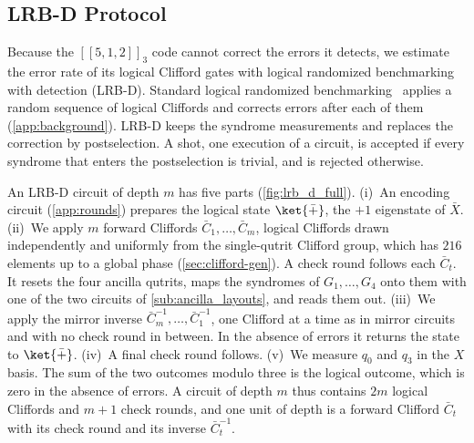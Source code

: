 \subsection{LRB-D Protocol}
\label{sub:lrb_d}\label{subsub:postselection}

Because the $[[5,1,2]]_3$ code cannot correct the errors it detects, we estimate the error rate of its logical Clifford gates with logical randomized benchmarking with detection (LRB-D). Standard logical randomized benchmarking~\cite{Combes2017} applies a random sequence of logical Cliffords and corrects errors after each of them (\autoref{app:background}). LRB-D keeps the syndrome measurements and replaces the correction by postselection. A shot, one execution of a circuit, is accepted if every syndrome that enters the postselection is trivial, and is rejected otherwise.

An LRB-D circuit of depth $m$ has five parts (\autoref{fig:lrb_d_full}). (i)~An encoding circuit (\autoref{app:rounds}) prepares the logical state $\ket{\bar{+}}$, the $+1$ eigenstate of $\bar X$. (ii)~We apply $m$ forward Cliffords $\bar C_1, \dots, \bar C_m$, logical Cliffords drawn independently and uniformly from the single-qutrit Clifford group, which has $216$ elements up to a global phase (\autoref{sec:clifford-gen}). A check round follows each $\bar C_t$. It resets the four ancilla qutrits, maps the syndromes of $G_1, \dots, G_4$ onto them with one of the two circuits of \autoref{sub:ancilla_layouts}, and reads them out. (iii)~We apply the mirror inverse $\bar C_m^{-1}, \dots, \bar C_1^{-1}$, one Clifford at a time as in mirror circuits~\cite{Proctor2022MirrorRB} and with no check round in between. In the absence of errors it returns the state to $\ket{\bar{+}}$. (iv)~A final check round follows. (v)~We measure $q_0$ and $q_3$ in the $X$ basis. The sum of the two outcomes modulo three is the logical outcome, which is zero in the absence of errors. A circuit of depth $m$ thus contains $2m$ logical Cliffords and $m+1$ check rounds, and one unit of depth is a forward Clifford $\bar C_t$ with its check round and its inverse $\bar C_t^{-1}$.

